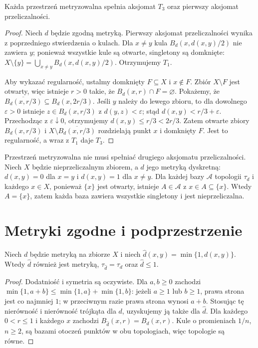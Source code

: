 \begin{stwierdzenie}
\label{prop:topog-metryka-t3-pierwszy}
Każda przestrzeń metryzowalna spełnia aksjomat $T_3$
oraz pierwszy aksjomat przeliczalności.
\end{stwierdzenie}
\begin{proof}
Niech $d$ będzie zgodną metryką. Pierwszy aksjomat
przeliczalności wynika z poprzedniego stwierdzenia o kulach.
Dla $x\ne y$ kula $B_d(x,d(x,y)/2)$ nie zawiera $y$;
ponieważ wszystkie kule są otwarte, singletony są domknięte:
$X\setminus\{y\}=\bigcup_{x\ne y} B_d(x,d(x,y)/2)$.
Otrzymujemy $T_1$.

Aby wykazać regularność, ustalmy domknięty $F\subseteq X$
i $x\notin F$. Zbiór $X\setminus F$ jest otwarty,
więc istnieje $r>0$ takie, że $B_d(x,r)\cap F=\varnothing$.
Pokażemy, że $\overline{B_d(x,r/3)}\subseteq B_d(x,2r/3)$.
Jeśli $y$ należy do lewego zbioru, to dla dowolnego
$\varepsilon>0$ istnieje $z\in B_d(x,r/3)$
z $d(y,z)<\varepsilon$; stąd
$d(x,y)<r/3+\varepsilon$.
Przechodząc z $\varepsilon\downarrow0$, otrzymujemy
$d(x,y)\le r/3<2r/3$. Zatem otwarte zbiory
$B_d(x,r/3)$ i $X\setminus\overline{B_d(x,r/3)}$
rozdzielają punkt $x$ i domknięty $F$. Jest to regularność,
a wraz z $T_1$ daje $T_3$.
\end{proof}

\begin{uwaga}
Przestrzeń metryzowalna nie musi spełniać drugiego aksjomatu
przeliczalności. Niech $X$ będzie nieprzeliczalnym zbiorem,
a $d$ jego metryką dyskretną: $d(x,y)=0$ dla $x=y$
i $d(x,y)=1$ dla $x\ne y$. Dla każdej bazy $\mathcal A$
topologii $\tau_d$ i każdego $x\in X$, ponieważ
$\{x\}$ jest otwarty, istnieje $A\in\mathcal A$ z
$x\in A\subseteq\{x\}$. Wtedy $A=\{x\}$, zatem
każda baza zawiera wszystkie singletony i jest
nieprzeliczalna.
\end{uwaga}

\section{Metryki zgodne i podprzestrzenie}
\label{sec:topog-metryki-zgodne}

\begin{stwierdzenie}
\label{prop:topog-min-metryka}
Niech $d$ będzie metryką na zbiorze $X$ i niech
$\widehat d(x,y)=\min\{1,d(x,y)\}$.
Wtedy $\widehat d$ również jest metryką,
$\tau_{\widehat d}=\tau_d$ oraz $\widehat d\le1$.
\end{stwierdzenie}
\begin{proof}
Dodatniość i symetria są oczywiste. Dla $a,b\ge0$
zachodzi
$\min\{1,a+b\}\le\min\{1,a\}+\min\{1,b\}$:
jeżeli $a\ge1$ lub $b\ge1$, prawa strona jest co najmniej
$1$; w przeciwnym razie prawa strona wynosi $a+b$.
Stosując tę nierówność i nierówność trójkąta dla $d$,
uzyskujemy ją także dla $\widehat d$.
Dla każdego $0<r\le1$ i każdego $x$ zachodzi
$B_{\widehat d}(x,r)=B_d(x,r)$.
Kule o promieniach $1/n$, $n\ge2$, są bazami otoczeń
punktów w obu topologiach, więc topologie są równe.
\end{proof}

